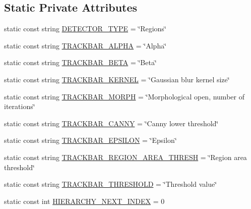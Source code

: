 \subsection*{Static Private Attributes}
\begin{DoxyCompactItemize}
\item 
static const string \hyperlink{classmultiscale_1_1analysis_1_1RegionDetector_a726ba9cf0864eadfda914204b9f75233}{D\-E\-T\-E\-C\-T\-O\-R\-\_\-\-T\-Y\-P\-E} = \char`\"{}Regions\char`\"{}
\item 
static const string \hyperlink{classmultiscale_1_1analysis_1_1RegionDetector_a5513e029d4d4cf249aa40364489f7a85}{T\-R\-A\-C\-K\-B\-A\-R\-\_\-\-A\-L\-P\-H\-A} = \char`\"{}Alpha\char`\"{}
\item 
static const string \hyperlink{classmultiscale_1_1analysis_1_1RegionDetector_a79d7878ed55bf12a87637896a1f44e37}{T\-R\-A\-C\-K\-B\-A\-R\-\_\-\-B\-E\-T\-A} = \char`\"{}Beta\char`\"{}
\item 
static const string \hyperlink{classmultiscale_1_1analysis_1_1RegionDetector_a79b72da59c92b368fb7894fe1f424e00}{T\-R\-A\-C\-K\-B\-A\-R\-\_\-\-K\-E\-R\-N\-E\-L} = \char`\"{}Gaussian blur kernel size\char`\"{}
\item 
static const string \hyperlink{classmultiscale_1_1analysis_1_1RegionDetector_a0358affd40f13327b10447b7fe938338}{T\-R\-A\-C\-K\-B\-A\-R\-\_\-\-M\-O\-R\-P\-H} = \char`\"{}Morphological open, number of iterations\char`\"{}
\item 
static const string \hyperlink{classmultiscale_1_1analysis_1_1RegionDetector_a8c1c5cde2b7d42ddce44b7f8208f07cc}{T\-R\-A\-C\-K\-B\-A\-R\-\_\-\-C\-A\-N\-N\-Y} = \char`\"{}Canny lower threshold\char`\"{}
\item 
static const string \hyperlink{classmultiscale_1_1analysis_1_1RegionDetector_aa3f0755a58457592ac027b42576bd312}{T\-R\-A\-C\-K\-B\-A\-R\-\_\-\-E\-P\-S\-I\-L\-O\-N} = \char`\"{}Epsilon\char`\"{}
\item 
static const string \hyperlink{classmultiscale_1_1analysis_1_1RegionDetector_a6a2711f5cabb3af04a969fe38e1ef473}{T\-R\-A\-C\-K\-B\-A\-R\-\_\-\-R\-E\-G\-I\-O\-N\-\_\-\-A\-R\-E\-A\-\_\-\-T\-H\-R\-E\-S\-H} = \char`\"{}Region area threshold\char`\"{}
\item 
static const string \hyperlink{classmultiscale_1_1analysis_1_1RegionDetector_a7548c716410a4cb88cb41498de6b509c}{T\-R\-A\-C\-K\-B\-A\-R\-\_\-\-T\-H\-R\-E\-S\-H\-O\-L\-D} = \char`\"{}Threshold value\char`\"{}
\item 
static const int \hyperlink{classmultiscale_1_1analysis_1_1RegionDetector_af35ca384a8d1b50d00da2692fa47848c}{H\-I\-E\-R\-A\-R\-C\-H\-Y\-\_\-\-N\-E\-X\-T\-\_\-\-I\-N\-D\-E\-X} = 0

\end{DoxyCompactItemize}
